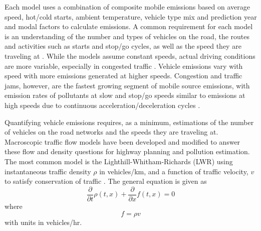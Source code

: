 Each model uses a combination of composite mobile emissions based on average speed, hot/cold starts, ambient temperature, vehicle type mix and prediction year and modal factors to calculate emissions. A common requirement for each model is an understanding of the number and types of vehicles on the road, the routes and activities such as starts and stop/go cycles, as well as the speed they are traveling at \cite{Franco2013}. While the models assume constant speeds, actual driving conditions are more variable, especially in congested traffic \cite{Freeman2015b}. Vehicle emissions vary with speed with more emissions generated at higher speeds. Congestion and traffic jams, however, are the fastest growing segment of mobile source emissions, with emission rates of pollutants at slow and stop/go speeds similar to emissions at high speeds due to continuous acceleration/deceleration cycles \cite{Barth2009}.

Quantifying vehicle emissions requires, as a minimum, estimations of the number of vehicles on the road networks and the speeds they are traveling at. Macroscopic traffic flow models have been developed and modified to answer these flow and density questions for highway planning and pollution estimation. The most common model is the Lighthill-Whitham-Richards (LWR) using instantaneous traffic density $\rho$ in vehicles/km, and a function of traffic velocity, $v$ to satisfy conservation of traffic \cite{Lighthill1955}. The general equation is given as
%
\begin{equation}
\label{eq:LRW}
\frac{\partial }{\partial t}\rho \left ( t,x \right )+\frac{\partial }{\partial x}f \left ( t,x \right )=0
\end{equation}	
%
where
%
\begin{equation}
\label{eq:trafficflow}
f = \rho v
\end{equation}	
%
with units in vehicles/hr. 

